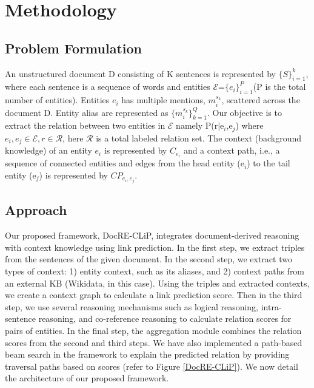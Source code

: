 \documentclass[letterpaper]{article} %
\begin{document}
\section{Methodology}
\subsection{Problem Formulation}
An unstructured document D consisting of K sentences is represented by $\{S\}_{i=1}^{k}$, where each sentence is a sequence of words and entities $\mathcal{E}$=$\{{e_i}\}_{i=1}^{P}$(P is the total number of entities). Entities $e_{i}$  has multiple mentions, $m_{i}^{s_{k}}$, scattered across the document D. Entity alias are represented as $\{{m_{i}^{s_{k}}}\}_{k=1}^{Q}$. Our objective is to extract the relation between two entities in $\mathcal{E}$ namely P(r$\mid${e$_i$,e$_j$}) where $e_i,e_j\in \mathcal{E}, r\in \mathcal{R}$, here $\mathcal{R}$ is a total labeled relation set. The context (background knowledge) of an entity ${e_i}$ is represented by $C_{e_i}$ and a context path, i.e., a sequence of connected entities and edges from the head entity (e$_i$) to the tail entity (e$_j$) is represented by $CP_{e_i,e_j}$.

\subsection{Approach}
 Our proposed framework, DocRE-CLiP, integrates document-derived reasoning with context knowledge using link prediction. In the first step, we extract triples from the sentences of the given document. In the second step, we extract two types of context: 1) entity context, such as its aliases, and 2) context paths from an external KB  (Wikidata, in this case). Using the triples and extracted contexts, we create a context graph to calculate a link prediction score. Then in the third step, we use several reasoning mechanisms such as logical reasoning, intra-sentence reasoning, and co-reference reasoning to calculate relation scores for pairs of entities. In the final step,
the aggregation module combines the relation scores from the second and third steps. We have also implemented a path-based beam search in the framework to explain the predicted relation by providing traversal paths based on scores (refer to Figure \ref{DocRE-CLiP}). We now detail the architecture of our proposed framework.
\end{document}
